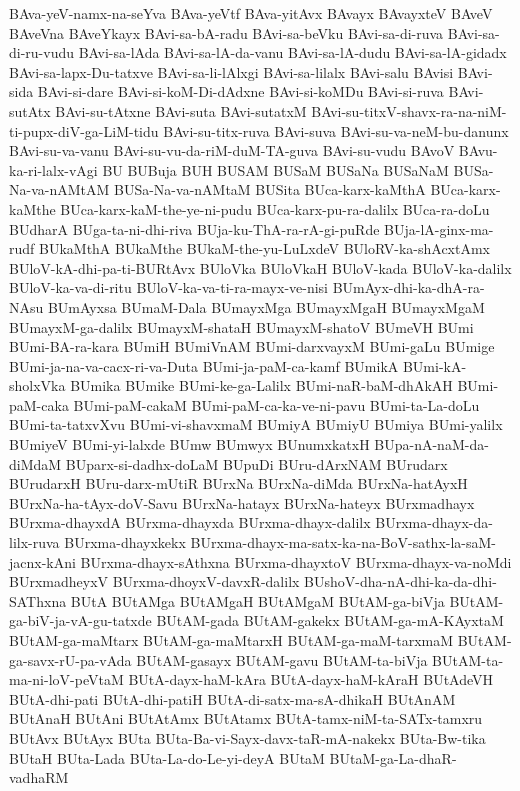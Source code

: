 {BAva-yeV-namx-na-seYva
BAva-yeVtf
BAva-yitAvx
BAvayx
BAvayxteV
BAveV
BAveVna
BAveYkayx
BAvi-sa-bA-radu
BAvi-sa-beVku
BAvi-sa-di-ruva
BAvi-sa-di-ru-vudu
BAvi-sa-lAda
BAvi-sa-lA-da-vanu
BAvi-sa-lA-dudu
BAvi-sa-lA-gidadx
BAvi-sa-lapx-Du-tatxve
BAvi-sa-li-lAlxgi
BAvi-sa-lilalx
BAvi-salu
BAvisi
BAvi-sida
BAvi-si-dare
BAvi-si-koM-Di-dAdxne
BAvi-si-koMDu
BAvi-si-ruva
BAvi-sutAtx
BAvi-su-tAtxne
BAvi-suta
BAvi-sutatxM
BAvi-su-titxV-shavx-ra-na-niM-ti-pupx-diV-ga-LiM-tidu
BAvi-su-titx-ruva
BAvi-suva
BAvi-su-va-neM-bu-danunx
BAvi-su-va-vanu
BAvi-su-vu-da-riM-duM-TA-guva
BAvi-su-vudu
BAvoV
BAvu-ka-ri-lalx-vAgi
BU
BUBuja
BUH
BUSAM
BUSaM
BUSaNa
BUSaNaM
BUSa-Na-va-nAMtAM
BUSa-Na-va-nAMtaM
BUSita
BUca-karx-kaMthA
BUca-karx-kaMthe
BUca-karx-kaM-the-ye-ni-pudu
BUca-karx-pu-ra-dalilx
BUca-ra-doLu
BUdharA
BUga-ta-ni-dhi-riva
BUja-ku-ThA-ra-rA-gi-puRde
BUja-lA-ginx-ma-rudf
BUkaMthA
BUkaMthe
BUkaM-the-yu-LuLxdeV
BUloRV-ka-shAcxtAmx
BUloV-kA-dhi-pa-ti-BURtAvx
BUloVka
BUloVkaH
BUloV-kada
BUloV-ka-dalilx
BUloV-ka-va-di-ritu
BUloV-ka-va-ti-ra-mayx-ve-nisi
BUmAyx-dhi-ka-dhA-ra-NAsu
BUmAyxsa
BUmaM-Dala
BUmayxMga
BUmayxMgaH
BUmayxMgaM
BUmayxM-ga-dalilx
BUmayxM-shataH
BUmayxM-shatoV
BUmeVH
BUmi
BUmi-BA-ra-kara
BUmiH
BUmiVnAM
BUmi-darxvayxM
BUmi-gaLu
BUmige
BUmi-ja-na-va-cacx-ri-va-Duta
BUmi-ja-paM-ca-kamf
BUmikA
BUmi-kA-sholxVka
BUmika
BUmike
BUmi-ke-ga-Lalilx
BUmi-naR-baM-dhAkAH
BUmi-paM-caka
BUmi-paM-cakaM
BUmi-paM-ca-ka-ve-ni-pavu
BUmi-ta-La-doLu
BUmi-ta-tatxvXvu
BUmi-vi-shavxmaM
BUmiyA
BUmiyU
BUmiya
BUmi-yalilx
BUmiyeV
BUmi-yi-lalxde
BUmw
BUmwyx
BUnumxkatxH
BUpa-nA-naM-da-diMdaM
BUparx-si-dadhx-doLaM
BUpuDi
BUru-dArxNAM
BUrudarx
BUrudarxH
BUru-darx-mUtiR
BUrxNa
BUrxNa-diMda
BUrxNa-hatAyxH
BUrxNa-ha-tAyx-doV-Savu
BUrxNa-hatayx
BUrxNa-hateyx
BUrxmadhayx
BUrxma-dhayxdA
BUrxma-dhayxda
BUrxma-dhayx-dalilx
BUrxma-dhayx-da-lilx-ruva
BUrxma-dhayxkekx
BUrxma-dhayx-ma-satx-ka-na-BoV-sathx-la-saM-jacnx-kAni
BUrxma-dhayx-sAthxna
BUrxma-dhayxtoV
BUrxma-dhayx-va-noMdi
BUrxmadheyxV
BUrxma-dhoyxV-davxR-dalilx
BUshoV-dha-nA-dhi-ka-da-dhi-SAThxna
BUtA
BUtAMga
BUtAMgaH
BUtAMgaM
BUtAM-ga-biVja
BUtAM-ga-biV-ja-vA-gu-tatxde
BUtAM-gada
BUtAM-gakekx
BUtAM-ga-mA-KAyxtaM
BUtAM-ga-maMtarx
BUtAM-ga-maMtarxH
BUtAM-ga-maM-tarxmaM
BUtAM-ga-savx-rU-pa-vAda
BUtAM-gasayx
BUtAM-gavu
BUtAM-ta-biVja
BUtAM-ta-ma-ni-loV-peVtaM
BUtA-dayx-haM-kAra
BUtA-dayx-haM-kAraH
BUtAdeVH
BUtA-dhi-pati
BUtA-dhi-patiH
BUtA-di-satx-ma-sA-dhikaH
BUtAnAM
BUtAnaH
BUtAni
BUtAtAmx
BUtAtamx
BUtA-tamx-niM-ta-SATx-tamxru
BUtAvx
BUtAyx
BUta
BUta-Ba-vi-Sayx-davx-taR-mA-nakekx
BUta-Bw-tika
BUtaH
BUta-Lada
BUta-La-do-Le-yi-deyA
BUtaM
BUtaM-ga-La-dhaR-vadhaRM
}
